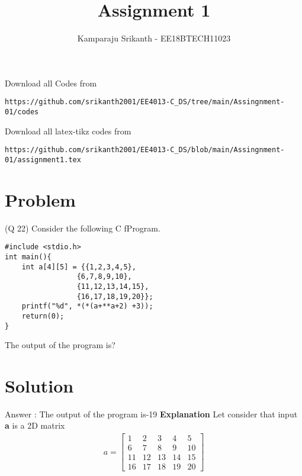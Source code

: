 \documentclass[journal,12pt,twocolumn]{IEEEtran}
\begin{document}
     \def\rightbox#1{\makebox[0in][r]{#1}}
     \def\centbox#1{\makebox[0in]{#1}}
     \def\topbox#1{\raisebox{-\baselineskip}[0in][0in]{#1}}
     \def\midbox#1{\raisebox{-0.5\baselineskip}[0in][0in]{#1}}
\vspace{3cm}
\title{Assignment 1}
\author{Kamparaju Srikanth - EE18BTECH11023}
\maketitle
\newpage
\bigskip
\renewcommand{\thefigure}{\theenumi}
\renewcommand{\thetable}{\theenumi}
Download all Codes from 
%
\begin{lstlisting}
https://github.com/srikanth2001/EE4013-C_DS/tree/main/Assingnment-01/codes
\end{lstlisting}
Download all latex-tikz codes from 
%
\begin{lstlisting}
https://github.com/srikanth2001/EE4013-C_DS/blob/main/Assingnment-01/assignment1.tex
\end{lstlisting}
\section{Problem}
(Q 22) Consider the following C fProgram.
\begin{lstlisting}
#include <stdio.h>
int main(){
    int a[4][5] = {{1,2,3,4,5},
                 {6,7,8,9,10},
                 {11,12,13,14,15},
                 {16,17,18,19,20}};
    printf("%d", *(*(a+**a+2) +3));
    return(0);
}
\end{lstlisting}
The output of the program is?

\section{Solution}
Answer : The output of the program is-19
\newline
\textbf{Explanation}
\newline
Let consider that input \textbf{a} is a 2D matrix 
\begin{align*}
 a =   \begin{bmatrix}
1&2&3&4&5\\
6&7&8&9&10\\
11&12&13&14&15\\
16&17&18&19&20
\end{bmatrix}  
\end{align*}
\end{document}
